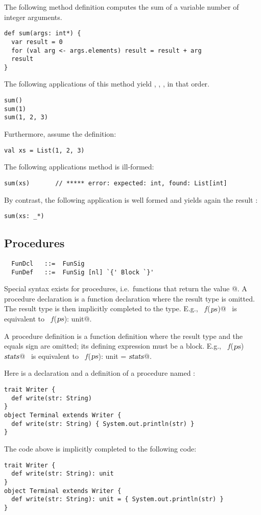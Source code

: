 \example The following method definition computes the sum of a variable number
of integer arguments.
\begin{lstlisting}
def sum(args: int*) {
  var result = 0 
  for (val arg <- args.elements) result = result + arg 
  result
}
\end{lstlisting}
The following applications of this method yield , ,
, in that order.
\begin{lstlisting}
sum()
sum(1)
sum(1, 2, 3)
\end{lstlisting}
Furthermore, assume the definition:
\begin{lstlisting}
val xs = List(1, 2, 3)
\end{lstlisting}
The following applications method \lstinline@sum@ is ill-formed:
\begin{lstlisting}
sum(xs)       // ***** error: expected: int, found: List[int]
\end{lstlisting}
By contrast, the following application is well formed and yields again
the result :
\begin{lstlisting}
sum(xs: _*) 
\end{lstlisting}

\subsection{Procedures}\label{sec:procedures}

\syntax\begin{lstlisting} 
  FunDcl   ::=  FunSig
  FunDef   ::=  FunSig [nl] `{' Block `}'
\end{lstlisting}

Special syntax exists for procedures, i.e.\ functions that return the
\verb@unit@ value \verb@{}@. 
A procedure declaration is a function declaration where the result type
is omitted. The result type is then implicitly completed to the
\verb@unit@ type. E.g., ~\lstinline@def $f$($\mbox{\sl ps}$)@~ is equivalent to
~\lstinline@def $f$($\mbox{\sl ps}$): unit@.

A procedure definition is a function definition where the result type
and the equals sign are omitted; its defining expression must be a block.
E.g., ~\lstinline@def $f$($\mbox{\sl ps}$) {$\mbox{\sl stats}$}@~ is equivalent to
~\lstinline@def $f$($\mbox{\sl ps}$): unit = {$\mbox{\sl stats}$}@.

\example Here is a declaration and a definition of a procedure named \lstinline@write@: 
\begin{lstlisting}
trait Writer { 
  def write(str: String)
}
object Terminal extends Writer {
  def write(str: String) { System.out.println(str) }
}
\end{lstlisting}
The code above is implicitly completed to the following code:
\begin{lstlisting}
trait Writer { 
  def write(str: String): unit
}
object Terminal extends Writer {
  def write(str: String): unit = { System.out.println(str) }
}
\end{lstlisting}

